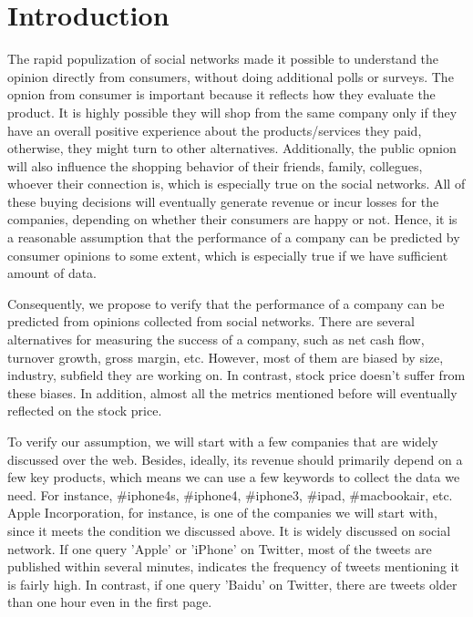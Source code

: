 \documentclass[12pt]{article}
\begin{document}
\maketitle



\section{Introduction}
The rapid populization of social networks made it possible to understand the opinion directly from consumers, without doing additional polls or surveys. The opnion from consumer is important because it reflects how they evaluate the product. It is highly possible they will shop from the same company only if they have an overall positive experience about the products/services they paid, otherwise, they might turn to other alternatives. Additionally, the public opnion will also influence the shopping behavior of their friends, family, collegues, whoever their connection is, which is especially true on the social networks. All of these buying decisions will eventually generate revenue or incur losses for the companies, depending on whether their consumers are happy or not. Hence, it is a reasonable assumption that the performance of a company can be predicted by consumer opinions to some extent, which is especially true if we have sufficient amount of data. 

Consequently, we propose to verify that the performance of a company can be predicted from opinions collected from social networks. There are several alternatives for measuring the success of a company, such as net cash flow, turnover growth, gross margin, etc. However, most of them are biased by size, industry, subfield they are working on. In contrast, stock price doesn't suffer from these biases. In addition, almost all the metrics mentioned before will eventually reflected on the stock price.

To verify our assumption, we will start with a few companies that are widely discussed over the web. Besides, ideally, its revenue should primarily depend on a few key products, which means we can use a few keywords to collect the data we need. For instance, \#iphone4s, \#iphone4, \#iphone3, \#ipad, \#macbookair, etc. Apple Incorporation, for instance, is one of the companies we will start with, since it meets the condition we discussed above. It is widely discussed on social network. If one query 'Apple' or 'iPhone' on Twitter, most of the tweets are published within several minutes, indicates the frequency of tweets mentioning it is fairly high. In contrast, if one query 'Baidu' on Twitter, there are tweets older than one hour even in the first page.
\end{document}

